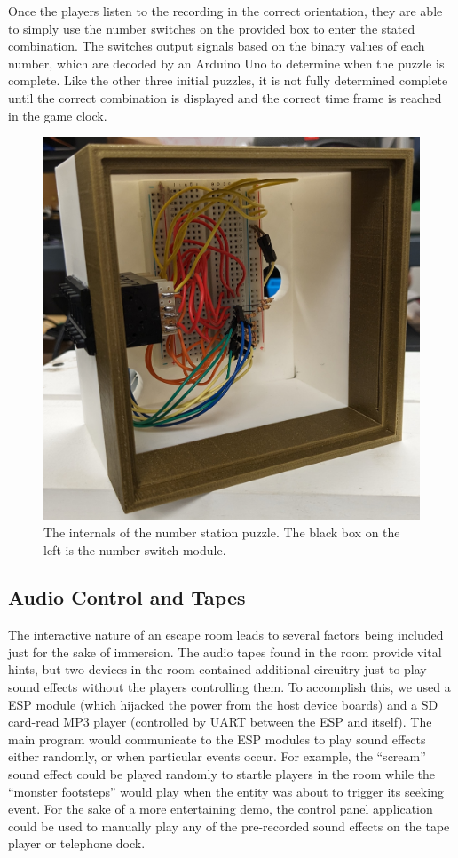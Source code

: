 \documentclass[conference]{IEEEtran}
\begin{document}
\indent Once the players listen to the recording in the correct orientation, they are able to simply use the number 
switches on the provided box to enter the stated combination. The switches output signals based on the binary values 
of each number, which are decoded by an Arduino Uno to determine when the puzzle is complete. Like the other three initial 
puzzles, it is not fully determined complete until the correct combination is displayed and the correct time frame is reached 
in the game clock.

\begin{figure}[ht]
    \centering
    \includegraphics[width=0.90\columnwidth]{Images/num_puzzle.jpg}
    \caption{The internals of the number station puzzle. The black box on the left is the number switch module.}
\end{figure}


\subsection{Audio Control and Tapes} %
The interactive nature of an escape room leads to several factors being included just for the sake of immersion. 
The audio tapes found in the room provide vital hints, but two devices in the room contained additional circuitry 
just to play sound effects without the players controlling them. To accomplish this, we used a ESP module (which 
hijacked the power from the host device boards) and a SD card-read MP3 player (controlled by UART between the ESP and 
itself). The main program would communicate to the ESP modules to play sound effects either randomly, or when particular 
events occur. For example, the ``scream'' sound effect could be played randomly to startle players in the room while the 
``monster footsteps'' would play when the entity was about to trigger its seeking event. For the sake of a more entertaining 
demo, the control panel application could be used to manually play any of the pre-recorded sound effects on the tape player 
or telephone dock.
\end{document}
